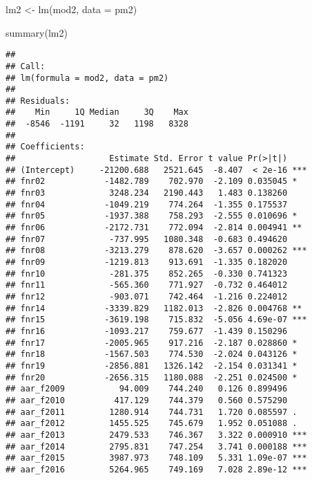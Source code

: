 \documentclass[
]{article}
\newenvironment{Shaded}{\begin{snugshade}}{\end{snugshade}}
\newcommand{\AttributeTok}[1]{\textcolor[rgb]{0.77,0.63,0.00}{#1}}
\newcommand{\FunctionTok}[1]{\textcolor[rgb]{0.00,0.00,0.00}{#1}}
\newcommand{\NormalTok}[1]{#1}
\newcommand{\OtherTok}[1]{\textcolor[rgb]{0.56,0.35,0.01}{#1}}
\begin{document}
\begin{Shaded}
\begin{Highlighting}[]
\NormalTok{lm2 }\OtherTok{\textless{}{-}} \FunctionTok{lm}\NormalTok{(mod2, }\AttributeTok{data =}\NormalTok{ pm2)}
\end{Highlighting}
\end{Shaded}

\begin{Shaded}
\begin{Highlighting}[]
\FunctionTok{summary}\NormalTok{(lm2)}
\end{Highlighting}
\end{Shaded}

\begin{verbatim}
## 
## Call:
## lm(formula = mod2, data = pm2)
## 
## Residuals:
##    Min     1Q Median     3Q    Max 
##  -8546  -1191     32   1198   8328 
## 
## Coefficients:
##                   Estimate Std. Error t value Pr(>|t|)    
## (Intercept)     -21200.688   2521.645  -8.407  < 2e-16 ***
## fnr02            -1482.789    702.970  -2.109 0.035045 *  
## fnr03             3248.234   2190.443   1.483 0.138260    
## fnr04            -1049.219    774.264  -1.355 0.175537    
## fnr05            -1937.388    758.293  -2.555 0.010696 *  
## fnr06            -2172.731    772.094  -2.814 0.004941 ** 
## fnr07             -737.995   1080.348  -0.683 0.494620    
## fnr08            -3213.279    878.620  -3.657 0.000262 ***
## fnr09            -1219.813    913.691  -1.335 0.182020    
## fnr10             -281.375    852.265  -0.330 0.741323    
## fnr11             -565.360    771.927  -0.732 0.464012    
## fnr12             -903.071    742.464  -1.216 0.224012    
## fnr14            -3339.829   1182.013  -2.826 0.004768 ** 
## fnr15            -3619.198    715.832  -5.056 4.69e-07 ***
## fnr16            -1093.217    759.677  -1.439 0.150296    
## fnr17            -2005.965    917.216  -2.187 0.028860 *  
## fnr18            -1567.503    774.530  -2.024 0.043126 *  
## fnr19            -2856.881   1326.142  -2.154 0.031341 *  
## fnr20            -2656.315   1180.088  -2.251 0.024500 *  
## aar_f2009           94.009    744.240   0.126 0.899496    
## aar_f2010          417.129    744.379   0.560 0.575290    
## aar_f2011         1280.914    744.731   1.720 0.085597 .  
## aar_f2012         1455.525    745.679   1.952 0.051088 .  
## aar_f2013         2479.533    746.367   3.322 0.000910 ***
## aar_f2014         2795.831    747.254   3.741 0.000188 ***
## aar_f2015         3987.973    748.109   5.331 1.09e-07 ***
## aar_f2016         5264.965    749.169   7.028 2.89e-12 ***

\end{verbatim}
\end{document}
